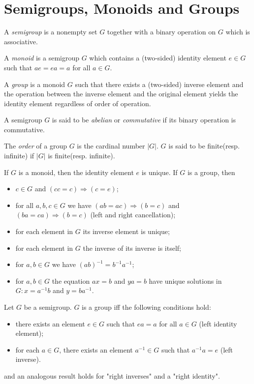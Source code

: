 \section{Semigroups, Monoids and Groups}
\begin{Definition}
	A \textit{semigroup} is a nonempty set $ G $ together with a binary operation on $ G $ which is associative.
\end{Definition}
\begin{Definition}
	A \textit{monoid} is a semigroup $ G $ which contains a (two-sided) identity element $ e \in G $ such that $ ae=ea=a $ for all $ a \in G $.
\end{Definition}
\begin{Definition}
	A \textit{group} is a monoid $ G $ such that there exists a (two-sided) inverse element and the operation between the inverse element and the original element yields the identity element regardless of order of operation.
\end{Definition}
\begin{Definition}
	A semigroup $ G $ is said to be \textit{abelian} or \textit{commutative} if its binary operation is commutative.
\end{Definition}
\begin{Definition}
	The \textit{order} of a group $ G $ is the cardinal number $ |G| $. $ G $ is said to be finite(resp. infinite) if $ |G| $ is finite(resp. infinite).
\end{Definition}
\begin{Theorem}
	If $ G $ is a monoid, then the identity element $ e $ is unique. If $ G $ is a group, then
	\begin{itemize}
		\item $ c \in G $ and $ (cc=c)\Rightarrow (c=e) $;
		\item for all $ a,b,c\in G $ we have $ (ab=ac)\Rightarrow(b=c) $ and $ (ba=ca)\Rightarrow(b=c) $ (left and right cancellation);
		\item for each element in $ G $ its inverse element is unique;
		\item for each element in $ G $ the inverse of its inverse is itself;
		\item for $ a,b\in G $ we have $ (ab)^{-1}=b^{-1}a^{-1} $;
		\item for $ a,b\in G $ the equation $ ax=b $ and $ ya=b $ have unique solutions in $ G:x=a^{-1}b $ and $ y=b a^{-1} $.
	\end{itemize}
\end{Theorem}
\begin{Proposition}
	Let $ G $ be a semigroup. $ G $ is a group iff the following conditions hold:
	\begin{itemize}
		\item there exists an element $ e \in G $ such that $ ea=a $ for all $ a \in G $ (left identity element);
		\item for each $ a \in G $, there exists an element $ a^{-1} \in G$ such that $ a^{-1}a=e $ (left inverse).
	\end{itemize}
and an analogous result holds for "right inverses" and a "right identity".
\end{Proposition}

